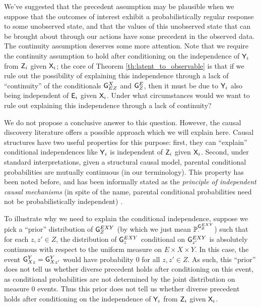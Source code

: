 We've suggested that the precedent assumption may be plausible when we suppose that the outcomes of interest exhibit a probabilistically regular response to some unobserved state, and that the values of this unobserved state that can be brought about through our actions have some precedent in the observed data. The continuity assumption deserves some more attention. Note that we require the continuity assumption to hold after conditioning on the independence of $\mathsf{Y}_i$ from $\mathsf{Z}_i$ given $\mathsf{X}_i$; the core of Theorem \ref{th:latent_to_observable} is that if we rule out the possibility of explaining this independence through a lack of ``continuity'' of the conditionals $\mathsf{G}^{X}_{EZ}$ and $\mathsf{G}^{E}_{Z}$, then it must be due to $\mathsf{Y}_i$ also being independent of $\mathsf{E}_i$ given $\mathsf{X}_i$. Under what circumstances would we want to rule out explaining this independence through a lack of continuity?

We do not propose a conclusive answer to this question. However, the causal discovery literature offers a possible approach which we will explain here. Causal structures have two useful properties for this purpose: first, they can ``explain'' conditional independences like $\mathsf{Y}_i$ is independent of $\mathsf{Z}_i$ given $\mathsf{X}_i$. Second, under standard interpretations, given a structural causal model, parental conditional probabilities are mutually continuous (in our terminology). This property has been noted before, and has been informally stated as the \emph{principle of independent causal mechanisms} (in spite of the name, parental conditional probabilities need not be probabilistically independent) \citep{lemeire_replacing_2013,peters_elements_2017}.

To illustrate why we need to explain the conditional independence, suppose we pick a ``prior'' distribution of $\mathsf{G}^{EXY}_{Z}$ (by which we just mean $\mathbb{P}_{\cdot}^{\mathsf{G}^{EXY}_{Z}}$) such that for each $z,z'\in Z$, the distribution of $\mathsf{G}^{EXY}_z$ conditional on $\mathsf{G}^{EXY}_{z'}$ is absolutely continuous with respect to the uniform measure on $E\times X\times Y$. In this case, the event $\mathsf{G}^Y_{Xz}=\mathsf{G}^Y_{Xz'}$ would have probability 0 for all $z,z'\in Z$. As such, this ``prior'' does not tell us whether diverse precedent holds after conditioning on this event, as conditional probabilities are not determined by the joint distribution on measure 0 events. Thus this prior does not tell us whether diverse precedent holds after conditioning on the independence of $\mathsf{Y}_i$ from $\mathsf{Z}_i$ given $\mathsf{X}_i$.

